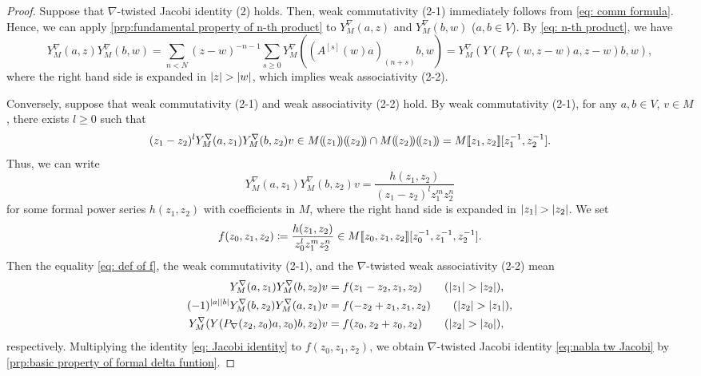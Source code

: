 \documentclass[final,reqno]{amsart}
\begin{document}
\begin{proof}
    Suppose that $\nabla$-twisted Jacobi identity (2) holds. Then, weak commutativity (2-1) immediately follows from \cref{eq: comm formula}. Hence, we can apply \cref{prp:fundamental property of n-th product} to $Y^\nabla_M(a,z)$ and $Y^\nabla_M(b,w)$ ($a,b\in V$). By \cref{eq: n-th product}, we have 
    \[
        Y^\nabla_M(a,z)Y^\nabla_M(b,w)
        =\sum_{n<N}(z-w)^{-n-1}\sum_{s\geq 0}Y^\nabla_M((A^{[s]}(w)a)_{(n+s)}b,w)
        =Y^\nabla_M(Y(P_\nabla(w,z-w)a,z-w)b,w),
    \]
    where the right hand side is expanded in $\abs{z}>\abs{w}$, which implies weak associativity (2-2).

    Conversely, suppose that weak commutativity (2-1) and weak associativity (2-2) hold. By weak commutativity (2-1), for any $a,b\in V$, $v\in M$, there exists $l\geq0$ such that
    \[
        (z_1-z_2)^lY^\nabla_M(a,z_1)Y^\nabla_M(b,z_2)v\in M\dpr{z_1}\dpr{z_2}\cap M\dpr{z_2}\dpr{z_1}=M\dbr{z_1,z_2}[z_1^{-1},z_2^{-1}].
    \]
    Thus, we can write
    \begin{equation}\label{eq: def of f}
        Y^\nabla_M(a,z_1)Y^\nabla_M(b,z_2)v=\frac{h(z_1,z_2)}{(z_1-z_2)^lz_1^mz_2^n}
    \end{equation}
    for some formal power series $h(z_1,z_2)$ with coefficients in $M$, where the right hand side is expanded in $\abs{z_1}>\abs{z_2}$. We set 
    \[
        f(z_0,z_1,z_2)\coloneqq \frac{h(z_1,z_2)}{z_0^lz_1^mz_2^n}\in M\llbracket z_0,z_1,z_2 \rrbracket[z_0^{-1},z_1^{-1},z_2^{-1}].
    \]
    Then the equality \cref{eq: def of f}, the weak commutativity (2-1), and the $\nabla$-twisted weak associativity (2-2) mean
    \begin{align*}
        Y^\nabla_M(a,z_1)Y^\nabla_M(b,z_2)v&=f(z_1-z_2,z_1,z_2)\qquad (\abs{z_1}>\abs{z_2}),\\
        (-1)^{\abs{a}\abs{b}}Y^\nabla_M(b,z_2)Y^\nabla_M(a,z_1)v&=f(-z_2+z_1,z_1,z_2) \qquad (\abs{z_2}>\abs{z_1}),\\
        Y^\nabla_M(Y(P_\nabla(z_2,z_0)a,z_0)b,z_2)v&=f(z_0,z_2+z_0,z_2)\qquad (\abs{z_2}>\abs{z_0}),
    \end{align*}
    respectively. Multiplying the identity \cref{eq: Jacobi identity} to $f(z_0,z_1,z_2)$, we obtain $\nabla$-twisted Jacobi identity \cref{eq:nabla tw Jacobi} by \cref{prp:basic property of formal delta funtion}. 
\end{proof}
\end{document}
